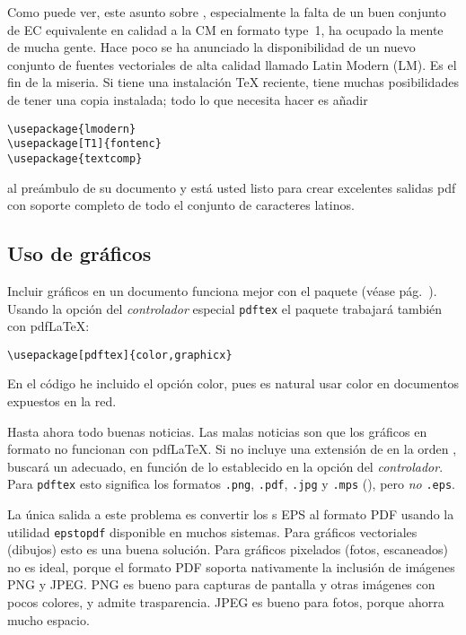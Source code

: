 Como puede ver, este asunto sobre \fontsnomo{}, especialmente la falta de un buen conjunto de \fontsnomo{} EC equivalente en calidad a la \fontnomo{} CM en formato type~1, ha ocupado la mente de mucha gente. Hace poco se ha anunciado la disponibilidad de un nuevo conjunto de fuentes vectoriales de alta calidad llamado Latin Modern (LM).  Es el fin de la miseria.  Si tiene una instalación  \TeX{} reciente, tiene muchas posibilidades de tener una copia instalada; todo lo que necesita hacer es añadir
\begin{code}
\begin{verbatim}  
\usepackage{lmodern}
\usepackage[T1]{fontenc} 
\usepackage{textcomp}
\end{verbatim}
\end{code}
al preámbulo de su documento y está usted listo para crear excelentes salidas pdf con soporte completo de todo el conjunto de caracteres latinos.

\subsection{Uso de gráficos}
\label{ssec:pdfgraph}

Incluir gráficos en un documento funciona mejor con el paquete  (véase pág.~\pageref{eps}). Usando la opción del \emph{controlador} especial \texttt{pdftex} el paquete trabajará también con pdf\LaTeX{}:
\begin{code}
\begin{verbatim}
\usepackage[pdftex]{color,graphicx}
\end{verbatim}
\end{code}
En el código he incluido el opción color, pues es natural usar color en documentos expuestos en la red.

Hasta ahora todo buenas noticias.  Las malas noticias son que los gráficos en formato \EPSi{} no funcionan con  pdf\LaTeX{}.  Si no incluye una extensión de \filenomo{} en la orden ,  buscará un \filenomo{} adecuado, en función de lo establecido en la opción del \emph{controlador}.  Para \texttt{pdftex} esto significa los formatos \texttt{.png}, \texttt{.pdf}, \texttt{.jpg} y \texttt{.mps} (\MP{}), pero \emph{no} \texttt{.eps}.

La única salida a este problema es convertir los \filenomo{}s EPS al formato PDF usando la utilidad \texttt{epstopdf} disponible en muchos sistemas.  Para gráficos vectoriales (dibujos) esto es una buena solución.  Para gráficos pixelados (fotos, escaneados) no es ideal, porque el formato PDF soporta nativamente la inclusión de imágenes PNG y JPEG.  PNG es bueno para capturas de pantalla y otras imágenes con pocos colores, y admite trasparencia.  JPEG es bueno para fotos, porque ahorra mucho espacio.

